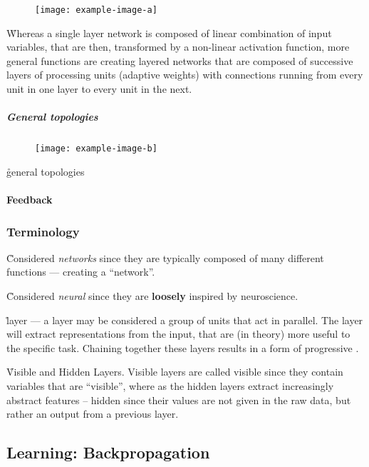 \begin{figure}[htp]
	\centering
	\texttt{[image: example-image-a]}\hfil
	\caption{}
	\label{fig:foundations_ann_layered_network}
\end{figure}

\r{Whereas a single layer network is composed of linear combination of input variables, that are then, transformed by a non-linear activation function, more general functions are creating layered networks that are composed of successive layers of processing units (adaptive weights) with connections running from every unit in one layer to every unit in the next.}

\subparagraph{General topologies}

\begin{figure}[htp]
	\centering
	\texttt{[image: example-image-b]}\hfil
	\caption{}
	\label{fig:foundations_ann_general_topology}
\end{figure}

\r{general topologies}

\paragraph{Feedback}

\subsubsection{Terminology}

\r{Considered \textit{networks} since they are typically composed of many different functions --- creating a ``network''.}

\r{Considered \textit{neural} since they are \textbf{loosely} inspired by neuroscience.}

\r{layer --- a layer may be considered a group of units that act in parallel. The layer will extract representations from the input, that are (in theory) more useful to the specific task.  Chaining together these layers results in a form of progressive .}

\r{Visible and Hidden Layers. Visible layers are called visible since they contain variables that are ``visible'', where as the hidden layers extract increasingly abstract features -- hidden since their values are not given in the raw data, but rather an output from a previous layer.}



\subsection{Learning: Backpropagation}

